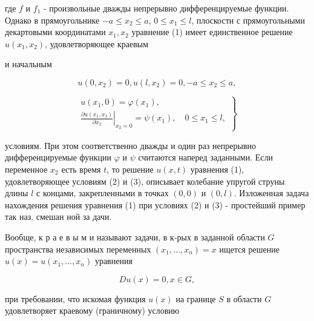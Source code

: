 \documentclass[10pt]{article}
\begin{document}
где $f$ и $f_{1}$ - произвольные дважды непрерывно дифференцируемые функции. Однако в прямоугольнике $-a \leqslant x_{2} \leqslant a$, $0 \leqslant x_{1} \leqslant l$, плоскости с прямоугольными декартовыми координатами $x_{1}, x_{2}$ уравнение (1) имеет единственное решение $u\left(x_{1}, x_{2}\right)$, удовлетворяющее краевым



и начальным



\[

u\left(0, x_{2}\right)=0, u\left(l, x_{2}\right)=0,-a \leqslant x_{2} \leqslant a,

\]



\[

\left.\begin{array}{c}

u\left(x_{1}, 0\right)=\varphi\left(x_{1}\right), \\

\left.\frac{\partial u\left(x_{1}, x_{2}\right)}{\partial x_{2}}\right|_{x_{2}=0}=\psi\left(x_{1}\right), \quad 0 \leqslant x_{1} \leqslant l,

\end{array}\right\}

\]



условиям. При этом соответственно дважды и один раз непрерывно дифференцируемые функции $\varphi$ и $\psi$ считаются наперед заданными. Если переменное $x_{2}$ есть время $t$, то решение $u(x, t)$ уравнения (1), удовлетворяющее условиям (2) и (3), описывает колебание упругой струны длины $l$ с концами, закрепленными в точках $(0,0)$ и $(0, l)$. Изложенная задача нахождения решения уравнения (1) при условиях (2) и (3) - простейший пример так наз. смешан ной за дачи.



Вообще, к р а е в ы м и называют задачи, в к-рых в заданной области $G$ пространства независимых переменных $\left(x_{1}, \ldots, x_{n}\right)=x$ ищется решение $u(x)=u\left(x_{1}, \ldots, x_{n}\right)$ уравнения



\[

D u(x)=0, x \in G,

\]



при требовании, что искомая функция $u(x)$ на границе $S$ в области $G$ удовлетворяет краевому (граничному) условию
\end{document}
